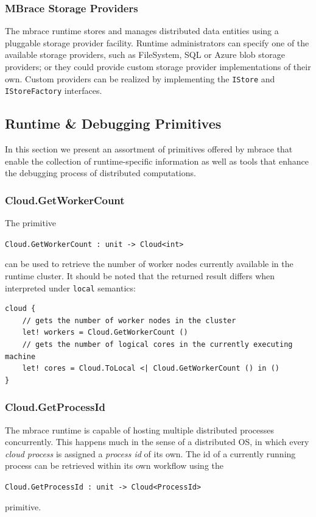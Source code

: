 \documentclass[9pt,a4paper]{article}
\newcommand{\mbrace}{mbrace}
\newcommand{\TitularMbrace}{MBrace}
\newcommand{\centertt}[1]{\begin{center}\texttt{#1}\end{center}}
\begin{document}
\subsubsection*{\TitularMbrace{} Storage Providers}

The \mbrace{} runtime stores and manages distributed data entities using a
pluggable storage provider facility. Runtime administrators can specify one
of the available storage providers, such as FileSystem, SQL or Azure blob storage
providers; or they could provide custom storage provider implementations of their own.
Custom providers can be realized by implementing the \texttt{IStore} and
\texttt{IStoreFactory} interfaces.

\subsection{Runtime \& Debugging Primitives}

In this section we present an assortment of primitives offered by \mbrace{}
that enable the collection of runtime-specific information as well as tools
that enhance the debugging process of distributed computations.

\subsubsection*{Cloud.GetWorkerCount}

The primitive
\centertt{Cloud.GetWorkerCount : unit -> Cloud<int>} 
can be used to retrieve the number of worker nodes currently available in the 
runtime cluster. It should be noted that the returned result differs when
interpreted under \texttt{local} semantics:
\begin{lstlisting}
cloud {
	// gets the number of worker nodes in the cluster
	let! workers = Cloud.GetWorkerCount ()
	// gets the number of logical cores in the currently executing machine
	let! cores = Cloud.ToLocal <| Cloud.GetWorkerCount () in ()
}
\end{lstlisting}

\subsubsection*{Cloud.GetProcessId}

The \mbrace{} runtime is capable of hosting multiple distributed processes concurrently.
This happens much in the sense of a distributed OS, in which every \emph{cloud process}
is assigned a \emph{process id} of its own. The id of a currently running process can
be retrieved within its own workflow using the
\centertt{Cloud.GetProcessId : unit -> Cloud<ProcessId>}
primitive.
\end{document}
